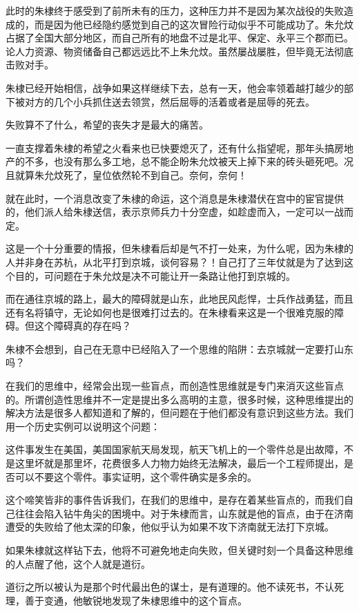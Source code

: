 \begin{multicols}{\theparacolNo}
		此时的朱棣终于感受到了前所未有的压力，这种压力并不是因为某次战役的失败造成的，而是因为他已经隐约感觉到自己的这次冒险行动似乎不可能成功了。朱允炆占据了全国大部分地区，而自己所有的地盘不过是北平、保定、永平三个郡而已。论人力资源、物资储备自己都远远比不上朱允炆。虽然屡战屡胜，但毕竟无法彻底击败对手。

		朱棣已经开始相信，战争如果这样继续下去，总有一天，他会率领着越打越少的部下被对方的几个小兵抓住送去领赏，然后屈辱的活着或者是屈辱的死去。

		失败算不了什么，希望的丧失才是最大的痛苦。

		一直支撑着朱棣的希望之火看来也已快要熄灭了，还有什么指望呢，那年头搞房地产的不多，也没有那么多工地，总不能企盼朱允炆被天上掉下来的砖头砸死吧。况且就算朱允炆死了，皇位依然轮不到自己。奈何，奈何！

		就在此时，一个消息改变了朱棣的命运，这个消息是朱棣潜伏在宫中的宦官提供的，他们派人给朱棣送信，表示京师兵力十分空虚，如趁虚而入，一定可以一战而定。

		这是一个十分重要的情报，但朱棣看后却是气不打一处来，为什么呢，因为朱棣的人并非身在苏杭，从北平打到京城，谈何容易？！自己打了三年仗就是为了达到这个目的，可问题在于朱允炆是决不可能让开一条路让他打到京城的。

		而在通往京城的路上，最大的障碍就是山东，此地民风彪悍，士兵作战勇猛，而且还有名将镇守，无论如何也是很难打过去的。在朱棣看来这是一个很难克服的障碍。但这个障碍真的存在吗？

		朱棣不会想到，自己在无意中已经陷入了一个思维的陷阱：去京城就一定要打山东吗？

		在我们的思维中，经常会出现一些盲点，而创造性思维就是专门来消灭这些盲点的。所谓创造性思维并不一定是提出多么高明的主意，很多时候，这种思维提出的解决方法是很多人都知道和了解的，但问题在于他们都没有意识到这些方法。我们用一个历史实例可以说明这个问题：

		这件事发生在美国，美国国家航天局发现，航天飞机上的一个零件总是出故障，不是这里坏就是那里坏，花费很多人力物力始终无法解决，最后一个工程师提出，是否可以不要这个零件。事实证明，这个零件确实是多余的。

		这个啼笑皆非的事件告诉我们，在我们的思维中，是存在着某些盲点的，而我们自己往往会陷入钻牛角尖的困境中。对于朱棣而言，山东就是他的盲点，由于在济南遭受的失败给了他太深的印象，他似乎认为如果不攻下济南就无法打下京城。

		如果朱棣就这样钻下去，他将不可避免地走向失败，但关键时刻一个具备这种思维的人点醒了他，这个人就是道衍。

		道衍之所以被认为是那个时代最出色的谋士，是有道理的。他不读死书，不认死理，善于变通，他敏锐地发现了朱棣思维中的这个盲点。


\end{multicols}
